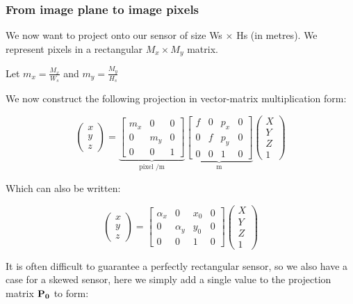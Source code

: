 \documentclass{article}
\begin{document}
\subsubsection{From image plane to image pixels}

We now want to project onto our sensor of size Ws $\times$ Hs (in metres). We represent pixels in a rectangular $M_{x} \times M_{y}$ matrix.

Let $m_{x} = \frac{M_{x}}{W_{s}}$ and $m_{y} = \frac{M_{y}}{H_{s}}$

We now construct the following projection in vector-matrix multiplication form:

\[
  \begin{pmatrix}
    x \\y \\z
  \end{pmatrix}
  = \underbrace{\begin{bmatrix}
    m_{x} & 0 & 0\\
    0 & m_{y} & 0\\
    0 & 0 & 1
  \end{bmatrix}}_{\text{pixel /m}}
  \underbrace{\begin{bmatrix}
    f & 0 & p_{x} & 0\\
    0 & f & p_{y} & 0\\
    0 & 0 & 1 & 0
  \end{bmatrix}}_{\text{m}}
  \begin{pmatrix}
    X \\Y\\ Z\\1
  \end{pmatrix}
\]

Which can also be written:

\[
  \begin{pmatrix}
    x \\ y \\z
  \end{pmatrix} =
  \begin{bmatrix}
    \alpha_{x} & 0  & x_{0} & 0\\
    0 & \alpha_{y} & y_{0} & 0\\
    0 & 0 & 1 & 0
  \end{bmatrix}
  \begin{pmatrix}
    X \\ Y \\ Z \\1
  \end{pmatrix}
\]

It is often difficult to guarantee a perfectly rectangular sensor, so we also have a case for a skewed sensor, here we simply add a single value to the projection matrix $\bf P_{0}$ to form:
\end{document}
